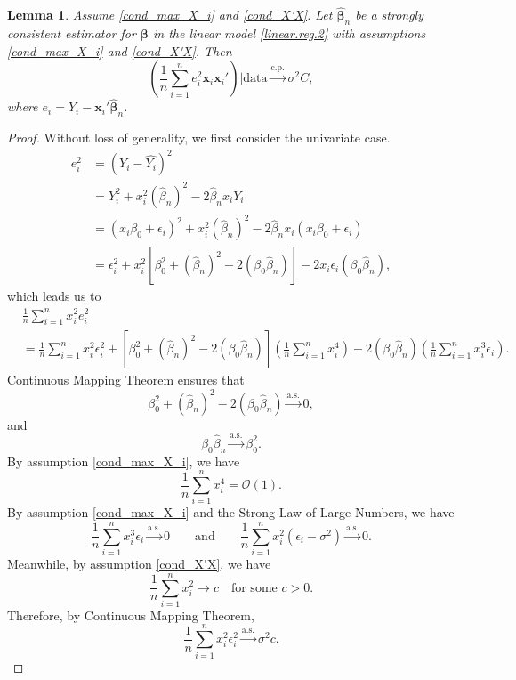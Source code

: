 \documentclass[12pt]{article}
\newcommand{\bhat}{\widehat{\bm{\beta}}_n} %
\newcommand{\be}{\bm{\beta}} %
\newcommand{\sumin}{\sum_{i=1}^n} %
\newcommand{\dn}{\frac{1}{n}} %
\newcommand{\CONV}[1]{\stackrel{\text{#1}}{\longrightarrow}} %
\newcommand{\x}{\bm{x}_i} %
\newtheorem{lem}{Lemma}[section]
\begin{document}
\begin{lem} \label{lem_ave_ei_xi^2} 
	Assume \eqref{cond_max_X_i} and \eqref{cond_X'X}. Let $\bhat$ be a strongly consistent estimator for $\be$ in the linear model \eqref{linear.reg.2} with assumptions \eqref{cond_max_X_i} and \eqref{cond_X'X}. Then
	$$
	\left(
		\dn \sumin e_i^2 \x \x'
	\right) \bigg| \text{data}
	\CONV{c.p.} 
	\sigma^2 C, 
	$$
	where $e_i = Y_i - \x' \bhat$.
\end{lem}

\begin{proof}
	Without loss of generality, we first consider the univariate case. 
	\begin{align*}
	e_i^2
	&= \left( Y_i - \widehat{Y_i} \right)^2 \\
	&= Y_i^2 
		+ x_i^2 \left( \widehat{\beta}_n \right)^2
		- 2 \widehat{\beta}_n x_i Y_i \\
	&= \left( x_i \beta_0 + \epsilon_i \right)^2
		+ x_i^2 \left( \widehat{\beta}_n \right)^2
		- 2 \widehat{\beta}_n x_i (x_i \beta_0 + \epsilon_i) \\
	&= \epsilon_i^2 
		+ x_i^2 \left[ 
					 \beta_0^2 + 
					 \left( \widehat{\beta}_n \right)^2
					 - 2 \left( \beta_0 \widehat{\beta}_n \right)
				\right]
		- 2 x_i \epsilon_i \left(
							\beta_0 \widehat{\beta}_n
							\right), 
	\end{align*}
	which leads us to 
	\begin{align*}
	&\dn \sumin x_i^2 e_i^2 \\
	&= \dn \sumin x_i^2 \epsilon_i^2
		+ \left[ 
				\beta_0^2 + 
				\left( \widehat{\beta}_n \right)^2
				- 2 \left( \beta_0 \widehat{\beta}_n \right)
		  \right] 
		  \left( \dn \sumin x_i^4 \right)
		- 2 \left( \beta_0 \widehat{\beta}_n \right)
			\left( \dn \sumin x_i^3 \epsilon_i \right).  
	\end{align*}
	Continuous Mapping Theorem ensures that 
	$$
	\beta_0^2 
	+ \left( \widehat{\beta}_n \right)^2
	- 2 \left( \beta_0 \widehat{\beta}_n \right) 
	\CONV{a.s.} 0,
	$$
	and 
	$$
	\beta_0 \widehat{\beta}_n
	\CONV{a.s.} \beta_0^2.
	$$
	By assumption \eqref{cond_max_X_i}, we have 
	$$
	\dn \sumin x_i^4 = \mathcal{O} (1).
	$$
	By assumption \eqref{cond_max_X_i} and the Strong Law of Large Numbers, we have
	$$
	\dn \sumin x_i^3 \epsilon_i \CONV{a.s.} 0
	\qquad \text{and} \qquad
	\dn \sumin x_i^2 (\epsilon_i - \sigma^2) \CONV{a.s.} 0.
	$$
	Meanwhile, by assumption \eqref{cond_X'X}, we have
	$$
	\dn \sumin x_i^2 \to c \quad \text{for some} \,\, c > 0.
	$$
	Therefore, by Continuous Mapping Theorem, 
	$$
	\dn \sumin x_i^2 \epsilon_i^2 \CONV{a.s.} \sigma^2 c.
$$
\end{proof}
\end{document}
